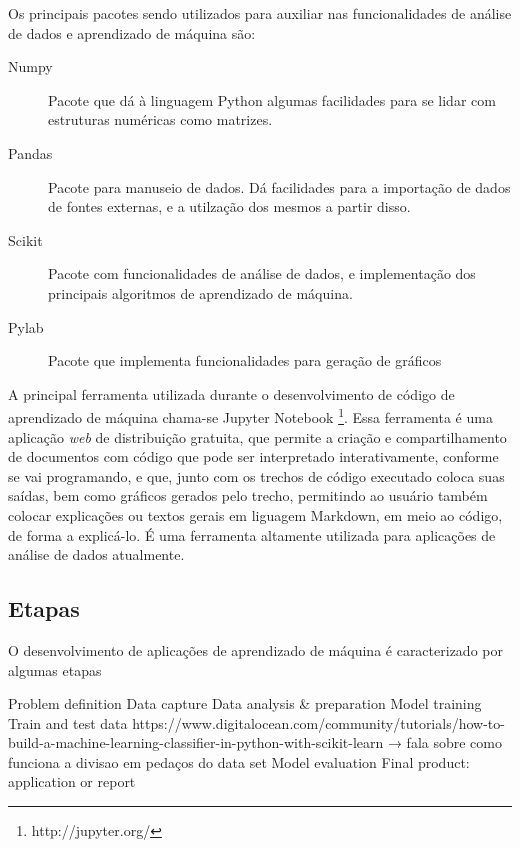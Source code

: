 			Os principais pacotes sendo utilizados para auxiliar nas funcionalidades de análise de dados e aprendizado de máquina são:

			\begin{description}
				\item [Numpy] Pacote que dá à linguagem Python algumas facilidades para se lidar com estruturas numéricas como matrizes.
				\item [Pandas] Pacote para manuseio de dados. Dá facilidades para a importação de dados de fontes externas, e a utilzação dos mesmos a partir disso.
				\item [Scikit] Pacote com funcionalidades de análise de dados, e implementação dos principais algoritmos de aprendizado de máquina.
				\item [Pylab] Pacote que implementa funcionalidades para geração de gráficos
			\end{description}

			A principal ferramenta utilizada durante o desenvolvimento de código de aprendizado de máquina chama-se Jupyter Notebook \footnote{http://jupyter.org/}. Essa ferramenta é uma aplicação \emph{web} de distribuição gratuita, que permite a criação e compartilhamento de documentos com código que pode ser interpretado interativamente, conforme se vai programando, e que, junto com os trechos de código executado coloca suas saídas, bem como gráficos gerados pelo trecho, permitindo ao usuário também colocar explicações ou textos gerais em liguagem Markdown, em meio ao código, de forma a explicá-lo. É uma ferramenta altamente utilizada para aplicações de análise de dados atualmente.

		\subsection{Etapas}


			O desenvolvimento de aplicações de aprendizado de máquina é caracterizado por algumas etapas  


Problem definition
Data capture
Data analysis & preparation
Model training
Train and test data
https://www.digitalocean.com/community/tutorials/how-to-build-a-machine-learning-classifier-in-python-with-scikit-learn  → fala sobre como funciona a divisao em pedaços do data set
Model evaluation
Final product: application or report


